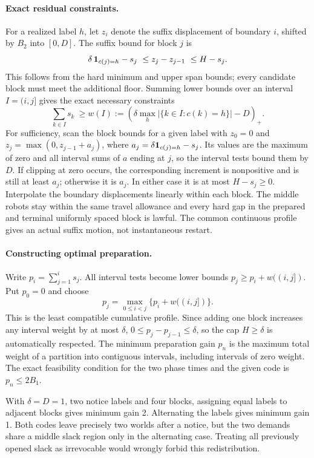 \documentclass[11pt]{article}
\begin{document}
\paragraph{Exact residual constraints.}
For a realized label \(h\), let \(z_i\) denote the suffix
displacement of boundary \(i\), shifted by \(B_2\) into
\([0,D]\). The suffix bound for block \(j\) is
\[
 \delta\,{\bf1}_{c(j)=h}-s_j
       \ \le z_j-z_{j-1}\ \le H-s_j .
\]
This follows from the hard minimum and upper span
bounds; every candidate block must meet the additional floor.
Summing lower bounds over an interval \(I=(i,j]\) gives
the exact necessary constraints
\[
 \sum_{k\in I}s_k \ \ge
 w(I):=\left(\delta\max_h |\{k\in I:c(k)=h\}|-D\right)_+ .
\]
For sufficiency, scan the block bounds for a given label with
\(z_0=0\) and \(z_j=\max(0,z_{j-1}+a_j)\),
where \(a_j=\delta{\bf1}_{c(j)=h}-s_j\). Its values are the maximum
of zero and all interval sums of \(a\) ending at \(j\), so the
interval tests bound them by \(D\). If clipping at zero occurs,
the corresponding increment is nonpositive and is still at
least \(a_j\); otherwise it is \(a_j\). In either case it is at
most \(H-s_j\ge0\). Interpolate the boundary displacements
linearly within each block. The middle robots stay within the
same travel allowance and every hard gap in the prepared and
terminal uniformly spaced block is lawful. The common continuous
profile gives an actual suffix motion, not instantaneous restart.

\paragraph{Constructing optimal preparation.}
Write \(p_i=\sum_{j=1}^i s_j\). All interval tests become lower
bounds \(p_j\ge p_i+w((i,j])\). Put \(p_0=0\) and choose
\[
 p_j=\max_{0\le i<j}\{p_i+w((i,j])\}.
\]
This is the least compatible cumulative profile. Since adding
one block increases any interval weight by at most \(\delta\),
\(0\le p_j-p_{j-1}\le\delta\), so the cap \(H\ge\delta\) is
automatically respected. The minimum preparation gain \(p_n\)
is the maximum total weight of a partition into contiguous
intervals, including intervals of zero weight.
The exact feasibility condition for the two phase times and
the given code is \(p_n\le2B_1\).

With \(\delta=D=1\), two notice labels and four blocks,
assigning equal labels to adjacent blocks gives minimum gain 2.
Alternating the labels gives minimum gain 1.
Both codes leave precisely two worlds after a notice, but the
two demands share a middle slack region only in the alternating
case. Treating all previously opened slack as irrevocable would
wrongly forbid this redistribution.
\end{document}
